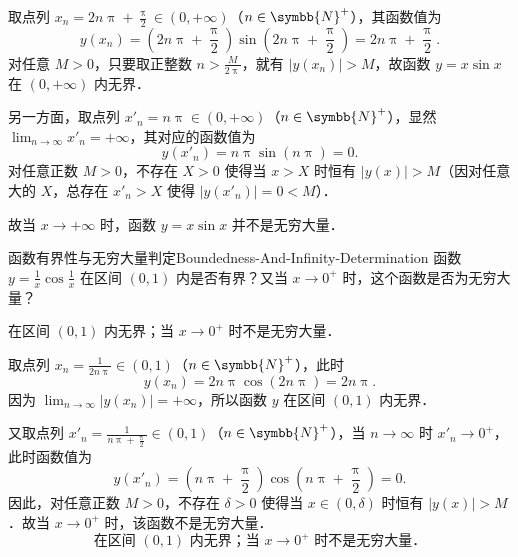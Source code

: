 \begin{myproof}
    取点列 $x_n = 2n\uppi + \frac{\uppi}{2} \in (0, +\infty)$（$n \in \symbb{N}^+$），其函数值为
    \begin{equation}
        y(x_n) = \left( 2n\uppi + \frac{\uppi}{2} \right) \sin\left( 2n\uppi + \frac{\uppi}{2} \right) = 2n\uppi + \frac{\uppi}{2}.
    \end{equation}
    对任意 $M > 0$，只要取正整数 $n > \frac{M}{2\uppi}$，就有 $|y(x_n)| > M$，故函数 $y = x\sin x$ 在 $(0, +\infty)$ 内无界．

    另一方面，取点列 $x'_n = n\uppi \in (0, +\infty)$（$n \in \symbb{N}^+$），显然 $\lim_{n\to\infty} x'_n = +\infty$，其对应的函数值为
    \begin{equation}
        y(x'_n) = n\uppi \sin(n\uppi) = 0.
    \end{equation}
    对任意正数 $M > 0$，不存在 $X > 0$ 使得当 $x > X$ 时恒有 $|y(x)| > M$（因对任意大的 $X$，总存在 $x'_n > X$ 使得 $|y(x'_n)| = 0 < M$）．

    故当 $x \to +\infty$ 时，函数 $y = x\sin x$ 并不是无穷大量．
\end{myproof}

\begin{problem}{函数有界性与无穷大量判定}{Boundedness-And-Infinity-Determination}
    函数 $y = \frac{1}{x}\cos \frac{1}{x}$ 在区间 $(0, 1)$ 内是否有界？又当 $x \to 0^+$ 时，这个函数是否为无穷大量？
\end{problem}

\begin{solution}
    在区间 $(0, 1)$ 内无界；当 $x \to 0^+$ 时不是无穷大量．

    取点列 $x_n = \frac{1}{2n\uppi} \in (0, 1)$（$n \in \symbb{N}^+$），此时
    \begin{equation}
        y(x_n) = 2n\uppi \cos(2n\uppi) = 2n\uppi.
    \end{equation}
    因为 $\lim_{n\to\infty} |y(x_n)| = +\infty$，所以函数 $y$ 在区间 $(0, 1)$ 内无界．

    又取点列 $x'_n = \frac{1}{n\uppi + \frac{\uppi}{2}} \in (0, 1)$（$n \in \symbb{N}^+$），当 $n \to \infty$ 时 $x'_n \to 0^+$，此时函数值为
    \begin{equation}
        y(x'_n) = \left( n\uppi + \frac{\uppi}{2} \right) \cos\left( n\uppi + \frac{\uppi}{2} \right) = 0.
    \end{equation}
    因此，对任意正数 $M > 0$，不存在 $\delta > 0$ 使得当 $x \in (0, \delta)$ 时恒有 $|y(x)| > M$．故当 $x \to 0^+$ 时，该函数不是无穷大量．
    \begin{equation}
        \boxed{\text{在区间 }(0, 1)\text{ 内无界；当 } x \to 0^+ \text{ 时不是无穷大量．}}
    \end{equation}
\end{solution}

